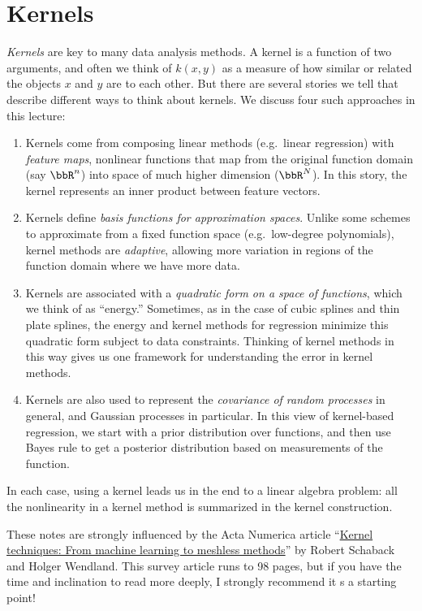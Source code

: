 \documentclass[12pt, leqno]{article} %
\begin{document}

\section{Kernels}

{\em Kernels} are key to many data analysis methods.  A kernel is a
function of two arguments, and often we think of $k(x,y)$ as a measure
of how similar or related the objects $x$ and $y$ are to each other.
But there are several stories we tell that describe different ways to
think about kernels.  We discuss four such approaches in this lecture:
\begin{enumerate}
\item
  Kernels come from composing linear methods (e.g.~linear regression)
  with {\em feature maps}, nonlinear functions that map from the
  original function domain (say $\bbR^n$) into space of much higher
  dimension ($\bbR^N$).  In this story, the kernel represents an inner product
  between feature vectors.
\item
  Kernels define {\em basis functions for approximation spaces}.  Unlike
  some schemes to approximate from a fixed function space
  (e.g.~low-degree polynomials), kernel methods are {\em adaptive},
  allowing more variation in regions of the function domain where we
  have more data.
\item
  Kernels are associated with a {\em quadratic form on a space of
  functions}, which we think of as ``energy.''  Sometimes, as in the
  case of cubic splines and thin plate splines, the energy and kernel methods
  for regression minimize this quadratic form subject to data
  constraints.  Thinking of kernel methods in this way gives us one
  framework for understanding the error in kernel methods.
\item
  Kernels are also used to represent the {\em covariance of random
  processes} in general, and Gaussian processes in particular.  In this
  view of kernel-based regression, we start with a prior distribution
  over functions, and then use Bayes rule to get a posterior
  distribution based on measurements of the function.
\end{enumerate}
In each case, using
a kernel leads us in the end to a linear algebra problem: all the
nonlinearity in a kernel method is summarized in the kernel construction.

These notes are strongly influenced by the Acta Numerica article
``\href{https://dx.doi.org/10.1017/S0962492906270016}{Kernel
  techniques: From machine learning to meshless methods}''
by Robert Schaback and Holger Wendland.  This survey article runs to
98 pages, but if you have the time and inclination to read more
deeply, I strongly recommend it s a starting point!
\end{document}
